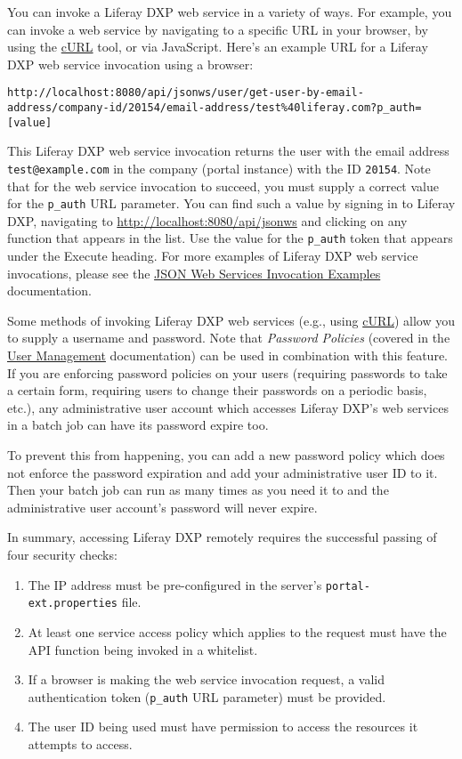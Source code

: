 You can invoke a Liferay DXP web service in a variety of ways. For
example, you can invoke a web service by navigating to a specific URL in
your browser, by using the \href{https://curl.haxx.se/}{cURL} tool, or
via JavaScript. Here's an example URL for a Liferay DXP web service
invocation using a browser:

\begin{verbatim}
http://localhost:8080/api/jsonws/user/get-user-by-email-address/company-id/20154/email-address/test%40liferay.com?p_auth=[value]
\end{verbatim}

This Liferay DXP web service invocation returns the user with the email
address \texttt{test@example.com} in the company (portal instance) with
the ID \texttt{20154}. Note that for the web service invocation to
succeed, you must supply a correct value for the \texttt{p\_auth} URL
parameter. You can find such a value by signing in to Liferay DXP,
navigating to \url{http://localhost:8080/api/jsonws} and clicking on any
function that appears in the list. Use the value for the
\texttt{p\_auth} token that appears under the Execute heading. For more
examples of Liferay DXP web service invocations, please see the
\href{/docs/7-0/tutorials/-/knowledge_base/t/json-web-services-invocation-examples}{JSON
Web Services Invocation Examples} documentation.

Some methods of invoking Liferay DXP web services (e.g., using
\href{https://curl.haxx.se/}{cURL}) allow you to supply a username and
password. Note that \emph{Password Policies} (covered in the
\href{/docs/7-0/user/-/knowledge_base/u/user-management}{User
Management} documentation) can be used in combination with this feature.
If you are enforcing password policies on your users (requiring
passwords to take a certain form, requiring users to change their
passwords on a periodic basis, etc.), any administrative user account
which accesses Liferay DXP's web services in a batch job can have its
password expire too.

To prevent this from happening, you can add a new password policy which
does not enforce the password expiration and add your administrative
user ID to it. Then your batch job can run as many times as you need it
to and the administrative user account's password will never expire.

In summary, accessing Liferay DXP remotely requires the successful
passing of four security checks:

\begin{enumerate}
\def\labelenumi{\arabic{enumi}.}
\tightlist
\item
  The IP address must be pre-configured in the server's
  \texttt{portal-ext.properties} file.
\item
  At least one service access policy which applies to the request must
  have the API function being invoked in a whitelist.
\item
  If a browser is making the web service invocation request, a valid
  authentication token (\texttt{p\_auth} URL parameter) must be
  provided.
\item
  The user ID being used must have permission to access the resources it
  attempts to access.
\end{enumerate}

